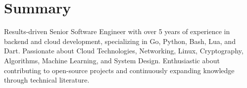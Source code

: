 \section{Summary}\closesection{}

Results-driven Senior Software Engineer with over 5 years of experience in backend and cloud development, specializing in Go, Python, Bash, Lua, and Dart. Passionate about Cloud Technologies, Networking, Linux, Cryptography, Algorithms, Machine Learning, and System Design. Enthusiastic about contributing to open-source projects and continuously expanding knowledge through technical literature.

